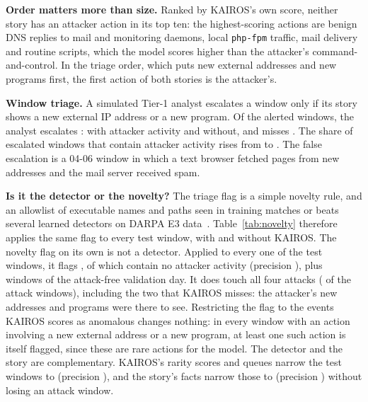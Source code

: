 \documentclass[conference]{IEEEtran}
\begin{document}
\textbf{Order matters more than size.} Ranked by KAIROS's own score, neither story has an attacker
action in its top ten: the highest-scoring actions are benign DNS replies to mail and monitoring
daemons, local \texttt{php-fpm} traffic, mail delivery and routine scripts,
which the model scores higher than the attacker's command-and-control. In the triage order, which puts
new external addresses and new programs first, the first action of both stories is the attacker's.

\textbf{Window triage.} A simulated Tier-1 analyst escalates a window only if its story shows a new
external IP address or a new program. Of the \TriageWindowsBefore{} alerted windows, the analyst
escalates \TriageWindowsAfter{}: \TriageTP{} with attacker activity and \TriageFP{} without, and misses
\TriageFN{}. The share of escalated windows that contain attacker activity rises from
\TriagePrecisionBefore{} to \TriagePrecisionAfter{}. The false escalation is a 04-06 window in which a
text browser fetched pages from new addresses and the mail server received spam.

\textbf{Is it the detector or the novelty?} The triage flag is a simple novelty rule, and an allowlist of
executable names and paths seen in training matches or beats several learned detectors on DARPA E3
data~\cite{guerra}. Table~\ref{tab:novelty}
therefore applies the same flag to every test window, with and without KAIROS.
The novelty flag on its own is not a detector. Applied to every one of the \CtlTestWindows{} test windows,
it flags \CtlNoveltyAllFlagged{}, of which \CtlNoveltyAllFP{} contain no attacker activity (precision
\CtlNoveltyAllPrecision{}), plus \CtlNoveltyAllVal{} windows of the attack-free validation day. It does
touch all four attacks (\CtlNoveltyAllTP{} of the \CtlGTWindows{} attack windows), including the two that
KAIROS misses: the attacker's new addresses and programs were there to see. Restricting the flag to the
events KAIROS scores as anomalous changes nothing: in every window with an action involving a new external
address or a new program, at least one such action is itself flagged, since these are rare actions for the
model. The detector and the
story are complementary. KAIROS's rarity scores and queues narrow the test windows to
\CtlKairosFlagged{} (precision \CtlKairosPrecision{}), and the story's facts narrow those to
\CtlKairosStoryFlagged{} (precision \CtlKairosStoryPrecision{}) without losing an attack window.
\end{document}
